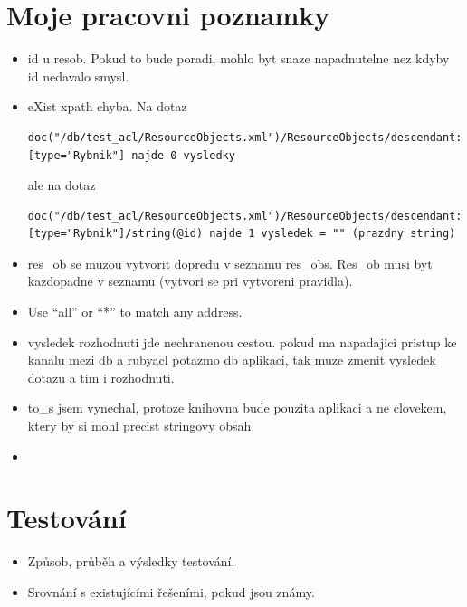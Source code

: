 \documentclass[11pt,twoside,a4paper]{book}
\begin{document}
\chapter{Moje pracovni poznamky}
\begin{itemize}

\item id u resob. Pokud to bude poradi, mohlo byt snaze napadnutelne nez kdyby id nedavalo smysl.

\item eXist xpath chyba. Na dotaz 
\begin{verbatim}
doc("/db/test_acl/ResourceObjects.xml")/ResourceObjects/descendant::*[type="Rybnik"] najde 0 vysledky
\end{verbatim}
ale na dotaz 
\begin{verbatim}
doc("/db/test_acl/ResourceObjects.xml")/ResourceObjects/descendant::*[type="Rybnik"]/string(@id) najde 1 vysledek = "" (prazdny string)
\end{verbatim}

\item res\_ob se muzou vytvorit dopredu v seznamu res\_obs. Res\_ob musi byt kazdopadne v seznamu (vytvori se pri vytvoreni pravidla).

\item Use “all” or “*” to match any address.

\item vysledek rozhodnuti jde nechranenou cestou. pokud ma napadajici pristup ke kanalu mezi db a rubyacl potazmo db aplikaci, tak muze zmenit vysledek dotazu a tim i rozhodnuti.

\item to\_s jsem vynechal, protoze knihovna bude pouzita aplikaci a ne clovekem, ktery by si mohl precist stringovy obsah.

\item 

\end{itemize}
\chapter{Testování}

\begin{itemize}
 \item Způsob, průběh a výsledky testování.
 \item Srovnání s existujícími řešeními, pokud jsou známy.
\end{itemize} 
\end{document}
